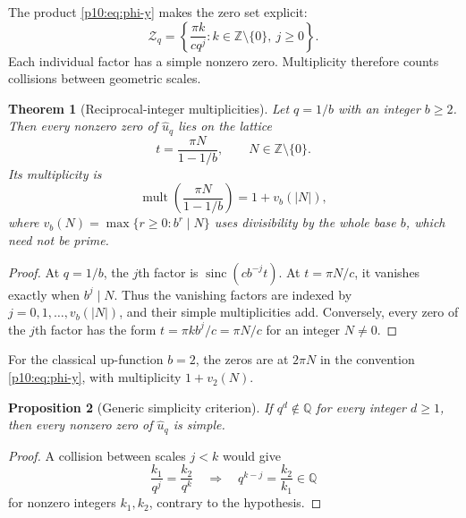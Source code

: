 \documentclass[11pt]{article}
\numberwithin{equation}{section}
\newtheorem{theorem}{Theorem}[section]
\newtheorem{proposition}[theorem]{Proposition}
\theoremstyle{definition}
\theoremstyle{remark}
\newcommand{\Q}{\mathbb Q}
\newcommand{\Z}{\mathbb Z}
\newcommand{\sinc}{\operatorname{sinc}}
\begin{document}
The product \eqref{p10:eq:phi-y} makes the zero set explicit:
\begin{equation}
 \mathcal Z_q
 =\left\{\frac{\pi k}{cq^j}: k\in\Z\setminus\{0\},\ j\ge0\right\}. \label{p10:eq:zero-set}
\end{equation}
Each individual factor has a simple nonzero zero.  Multiplicity therefore counts collisions
between geometric scales.

\begin{theorem}[Reciprocal-integer multiplicities]
\label{p10:thm:zero-multiplicity}
Let $q=1/b$ with an integer $b\ge2$.  Then every nonzero zero of $\widehat u_q$ lies on the
lattice
\begin{equation}
 t=\frac{\pi N}{1-1/b},\qquad N\in\Z\setminus\{0\}.          \label{p10:eq:zero-lattice}
\end{equation}
Its multiplicity is
\begin{equation}
 \boxed{\displaystyle
 \operatorname{mult}\!\left(\frac{\pi N}{1-1/b}\right)
 =1+v_b(|N|),}                                               \label{p10:eq:zero-mult}
\end{equation}
where
\(
 v_b(N)=\max\{r\ge0:b^r\mid N\}
\)
uses divisibility by the whole base $b$, which need not be prime.
\end{theorem}

\begin{proof}
At $q=1/b$, the $j$th factor is
$\sinc(cb^{-j}t)$.  At $t=\pi N/c$, it vanishes exactly when
$b^j\mid N$.  Thus the vanishing factors are indexed by
$j=0,1,\ldots,v_b(|N|)$, and their simple multiplicities add.  Conversely, every zero of the
$j$th factor has the form $t=\pi kb^j/c=\pi N/c$ for an integer $N\ne0$.
\end{proof}

For the classical up-function $b=2$, the zeros are at $2\pi N$ in the convention
\eqref{p10:eq:phi-y}, with multiplicity $1+v_2(N)$.

\begin{proposition}[Generic simplicity criterion]
\label{p10:prop:generic-zeros}
If $q^d\notin\Q$ for every integer $d\ge1$, then every nonzero zero of
$\widehat u_q$ is simple.
\end{proposition}

\begin{proof}
A collision between scales $j<k$ would give
\[
 \frac{k_1}{q^j}=\frac{k_2}{q^k}
 \quad\Longrightarrow\quad
 q^{k-j}=\frac{k_2}{k_1}\in\Q
\]
for nonzero integers $k_1,k_2$, contrary to the hypothesis.
\end{proof}
\end{document}
